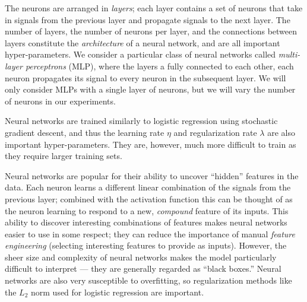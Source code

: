 The neurons are arranged in \emph{layers}; each layer contains a set of
neurons that take in signals from the previous layer and propagate
signals to the next layer.
%
The number of layers, the number of neurons per layer, and the
connections between layers constitute the \emph{architecture} of a
neural network, and are all important hyper-parameters.
%
We consider a particular class of neural networks called
\emph{multi-layer perceptrons} (MLP), where the layers a fully connected to
each other, \ie each neuron propagates its signal to every neuron in the
subsequent layer.
%
We will only consider MLPs with a single layer of neurons, but we will
vary the number of neurons in our experiments.

Neural networks are trained similarly to logistic regression using
stochastic gradient descent, and thus the learning rate $\eta$ and
regularization rate $\lambda$ are also important hyper-parameters.
%
They are, however, much more difficult to train as they require larger
training sets.

Neural networks are popular for their ability to uncover ``hidden''
features in the data.
%
Each neuron learns a different linear combination of the signals from
the previous layer; combined with the activation function this can be
thought of as the neuron learning to respond to a new, \emph{compound}
feature of its inputs.
%
This ability to discover interesting combinations of features makes
neural networks easier to use in some respect; they can reduce the
importance of manual \emph{feature engineering} (selecting interesting
features to provide as inputs).
%
However, the sheer size and complexity of neural networks makes the
model particularly difficult to interpret --- they are generally regarded
as ``black boxes.''
%
Neural networks are also very susceptible to overfitting, so
regularization methods like the $L_2$ norm used for logistic regression
are important.







\lstMakeShortInline{|}

